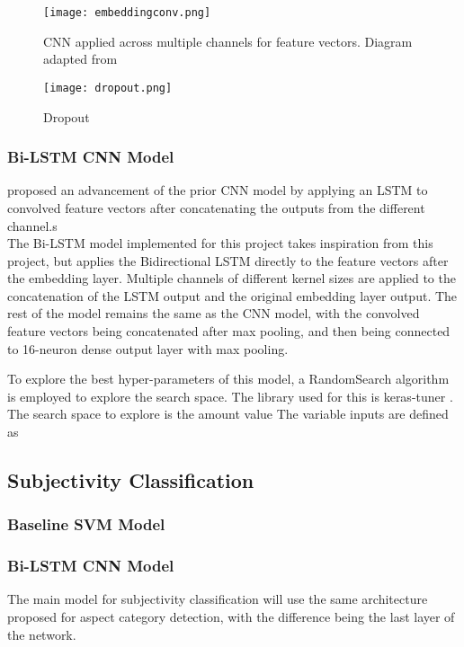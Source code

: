 \documentclass[11pt]{article}
\begin{document}
\begin{figure}[t]
    \begin{center}
        \texttt{[image: embeddingconv.png]}
        \caption{CNN applied across multiple channels for feature vectors. \newline 
        Diagram adapted from \textcolor{cite}{\cite{yoonkim}}}
        \label{embeddingconv}
    \end{center}
\end{figure}

\begin{figure}[t]
    \begin{center}
    \texttt{[image: dropout.png]}
    \caption{Dropout}
    \label{dropout_img}
    \end{center}
\end{figure}

\subsubsection{Bi-LSTM CNN Model}
\textcolor{cite}{\cite{clstm}} proposed an advancement of the prior CNN model by applying an LSTM to convolved feature vectors after concatenating the outputs from the different channel.s \\
The Bi-LSTM model implemented for this project takes inspiration from this project, but applies the Bidirectional LSTM directly to the feature vectors after the embedding layer. Multiple channels of different kernel sizes are applied to the concatenation of the LSTM output and the original embedding layer output. 
The rest of the model remains the same as the CNN model, with the convolved feature vectors being concatenated after max pooling, and then being connected to 16-neuron dense output layer with max pooling.  

To explore the best hyper-parameters of this model, a RandomSearch algorithm is employed to explore the search space. The library used for this is keras-tuner \cite{keras-tuner}. 
The search space to explore is the amount value 
The variable inputs are defined as 

\subsection{Subjectivity Classification}
\subsubsection{Baseline SVM Model}
\subsubsection{Bi-LSTM CNN Model}
The main model for subjectivity classification will use the same architecture proposed for aspect category detection, with the difference being the last layer of the network. 
\end{document}
